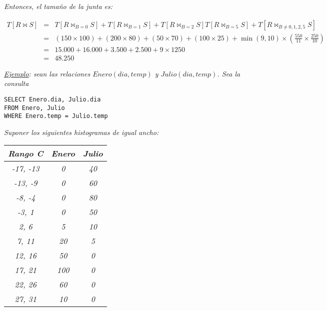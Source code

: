 \documentclass[a4paper, twoside]{article}
\begin{document}
\emph{Entonces, el tamaño de la junta es:}

\begin{eqnarray*}
	T \left[ R \bowtie S \right] & = & T \left[ R \bowtie_{B=0} S \right] + T \left[ R \bowtie_{B=1} S \right] + T \left[ R \bowtie_{B=2} S \right] T \left[ R \bowtie_{B=5} S \right] + T \left[ R \bowtie_{B\neq0,1,2,5} S \right]\\
	 & = & \left( 150 \times 100 \right) + \left( 200 \times 80 \right) + \left( 50 \times 70 \right) + \left( 100 \times 25 \right) + \min(9,10) \times \left( \frac{550}{11} \times \frac{250}{10} \right)\\
	 & = & 15.000+16.000+3.500+2.500+9 \times 1250\\
	 & = & 48.250
\end{eqnarray*}

\emph{\uline{Ejemplo}}\emph{: sean las relaciones $Enero(dia,temp)$ y $Julio(dia,temp)$. Sea la consulta}

\begin{lstlisting}
SELECT Enero.dia, Julio.dia
FROM Enero, Julio
WHERE Enero.temp = Julio.temp
\end{lstlisting}

\emph{Suponer los siguientes histogramas de igual ancho:}

\begin{center}
	\begin{tabular}{|c|c|c|}
		\hline 
		\emph{Rango C\textdegree{}} & \emph{Enero} & \emph{Julio}\\
		\hline 
		\hline 
		\emph{-17, -13} & \emph{0} & \emph{40}\\
		\hline 
		\emph{-13, -9} & \emph{0} & \emph{60}\\
		\hline 
		\emph{-8, -4} & \emph{0} & \emph{80}\\
		\hline 
		\emph{-3, 1} & \emph{0} & \emph{50}\\
		\hline 
		\emph{2, 6} & \emph{5} & \emph{10}\\
		\hline 
		\emph{7, 11} & \emph{20} & \emph{5}\\
		\hline 
		\emph{12, 16} & \emph{50} & \emph{0}\\
		\hline 
		\emph{17, 21} & \emph{100} & \emph{0}\\
		\hline 
		\emph{22, 26} & \emph{60} & \emph{0}\\
		\hline 
		\emph{27, 31} & \emph{10} & \emph{0}\\
		\hline 
	\end{tabular}
\end{center}
\end{document}
